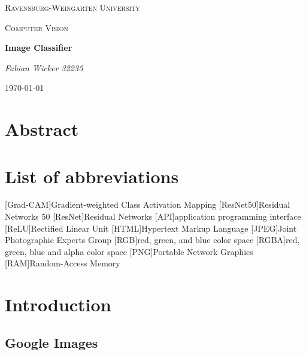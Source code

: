 \documentclass{scrartcl}
\begin{document}
	\begin{titlepage}
		\centering
		{\scshape\LARGE Ravensburg-Weingarten University\par}
		\vspace{1.5cm}
		\begin{figure}[hb]
			\centering
			\rwulogo[width=0.4\columnwidth]
		\end{figure}

		\vspace{5cm}
		{\scshape\Large Computer Vision\par}
		\vspace{0.25cm}
		{\huge\bfseries Image Classifier\par}
		\vspace{6cm}
		{\Large\itshape Fabian Wicker 32235\par}
		\vfill
		{\large \today\par}
	\end{titlepage}
	\clearpage
	\section{Abstract}
	
	\clearpage
	\cleardoubleoddpage
	\tableofcontents
	\clearpage
	\section*{List of abbreviations}
	\begin{acronym}[abbreviations]
	[Grad-CAM]{Gradient-weighted Class Activation Mapping}
	[ResNet50]{Residual Networks 50}
	[ResNet]{Residual Networks}
	[API]{application programming interface}
	[ReLU]{Rectified Linear Unit}
	[HTML]{Hypertext Markup Language}
	[JPEG]{Joint Photographic Experts Group}
	[RGB]{red, green, and blue color space}
	[RGBA]{red, green, blue and alpha color space}
	[PNG]{Portable Network Graphics}
	[RAM]{Random-Access Memory}
	\end{acronym}
	\clearpage

	\section{Introduction}
	

		\subsection{Google Images}
		\label{chap:google-images}
		
\end{document}
